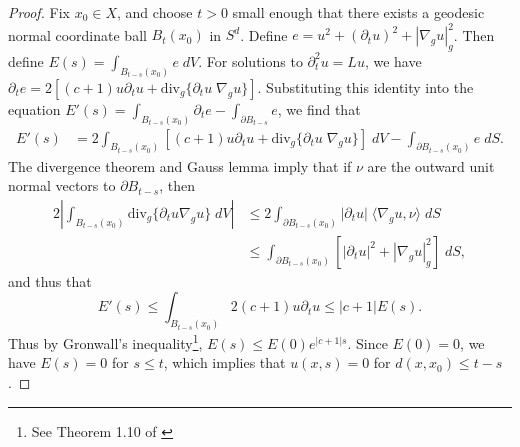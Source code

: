 \begin{proof}
  Fix $x_0 \in X$, and choose $t > 0$ small enough that there exists a geodesic normal coordinate ball $B_t(x_0)$ in $S^d$. Define $e = u^2 + (\partial_t u)^2 + |\nabla_g u|_g^2$. Then define $E(s) = \int_{B_{t-s}(x_0)} e\; dV$. For solutions to $\partial_t^2 u = Lu$, we have $\partial_t e = 2[ (c + 1) u \partial_t u + \text{div}_g \{ \partial_t u\; \nabla_g u \} ]$.
  Substituting this identity into the equation $E'(s) = \int_{B_{t-s}(x_0)} \partial_t e - \int_{\partial B_{t-s}} e$, we find that
  \begin{equation}
  \begin{split}
    E'(s) &= 2 \int_{B_{t-s}(x_0)} [(c+1) u \partial_t u + \text{div}_g \{ \partial_t u\; \nabla_g u \}]\; dV - \int_{\partial B_{t-s}(x_0)} e\; dS.
  \end{split}
  \end{equation}
  The divergence theorem and Gauss lemma imply that if $\nu$ are the outward unit normal vectors to $\partial B_{t-s}$, then
  \begin{equation}
  \begin{split}
    2 \left| \int_{B_{t-s}(x_0)} \text{div}_g \{ \partial_t u \nabla_g u \}\; dV \right| &\leq 2 \int_{\partial B_{t-s}(x_0)} |\partial_t u|\; \langle \nabla_g u, \nu \rangle\; dS\\\
    &\leq \int_{\partial B_{t-s}(x_0)} [|\partial_t u|^2 + |\nabla_g u|_g^2]\; dS,
  \end{split}
  \end{equation}
  and thus that
  \begin{equation}
    E'(s) \leq \int_{B_{t-s}(x_0)} 2(c+1) u \partial_t u \leq |c + 1| E(s).
  \end{equation}
  Thus by Gronwall's inequality\footnote{See Theorem 1.10 of \cite{TaoDispersive}}, $E(s) \leq E(0) e^{|c+1|s}$. Since $E(0) = 0$, we have $E(s) = 0$ for $s \leq t$, which implies that $u(x,s) = 0$ for $d(x,x_0) \leq t - s$.
\end{proof}

